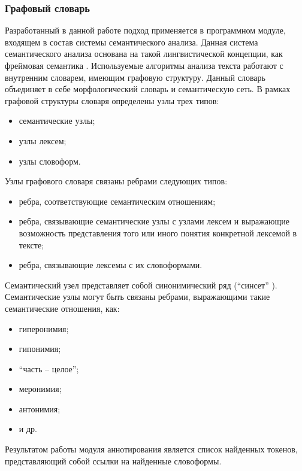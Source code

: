 \subsubsection{Графовый словарь}
Разработанный в данной работе подход применяется в программном модуле, входящем в состав системы семантического анализа. Данная система семантического анализа основана на такой лингвистической концепции, как фреймовая семантика \cite{fillmore1976frame}. Используемые алгоритмы анализа текста работают с внутренним словарем, имеющим графовую структуру. Данный словарь объединяет в себе морфологический словарь и семантическую сеть. В рамках графовой структуры словаря определены узлы трех типов:
\begin{itemize}
	\item
	семантические узлы;
	\item
	узлы лексем;
	\item
	узлы словоформ.
\end{itemize}
Узлы графового словаря связаны ребрами следующих типов:
\begin{itemize}
	\item
	ребра, соответствующие семантическим отношениям;
	\item
	ребра, связывающие семантические узлы с узлами лексем и выражающие возможность представления того или иного понятия конкретной лексемой в тексте;
	\item
	ребра, связывающие лексемы с их словоформами.
\end{itemize}
Семантический узел представляет собой синонимический ряд (``синсет'' \cite{wordnet}). Семантические узлы могут быть связаны ребрами, выражающими такие семантические отношения, как:
\begin{itemize}
\item
гиперонимия;
\item
гипонимия;
\item
``часть -- целое'';
\item
меронимия;
\item
антонимия;
\item
и др.
\end{itemize}
Результатом работы модуля аннотирования является список найденных токенов, представляющий собой ссылки на найденные словоформы.
